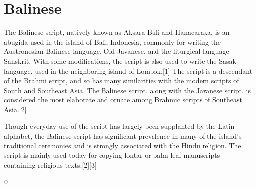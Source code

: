 \section{Balinese}


The Balinese script, natively known as Aksara Bali and Hanacaraka, is an abugida used in the island of Bali, Indonesia, commonly for writing the Austronesian Balinese language, Old Javanese, and the liturgical language Sanskrit. With some modifications, the script is also used to write the Sasak language, used in the neighboring island of Lombok.[1] The script is a descendant of the Brahmi script, and so has many similarities with the modern scripts of South and Southeast Asia. The Balinese script, along with the Javanese script, is considered the most elaborate and ornate among Brahmic scripts of Southeast Asia.[2]

Though everyday use of the script has largely been supplanted by the Latin alphabet, the Balinese script has significant prevalence in many of the island's traditional ceremonies and is strongly associated with the Hindu religion. The script is mainly used today for copying lontar or palm leaf manuscripts containing religious texts.[2][3]



{\indicative ◌ }

\setcounter{under}{"1B00}

